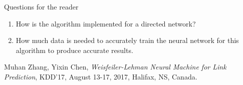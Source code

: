 \documentclass[12pt]{article}
\theoremstyle{remark}
\begin{document}
	Questions for the reader
	\begin{enumerate}
		\item How is the algorithm implemented for a directed network?
		\item How much data is needed to accurately train the neural network for this algorithm to produce accurate results.
	\end{enumerate}
	\vspace{0.5cm}
	
	\begin{thebibliography}{unsrt}
		Muhan Zhang, Yixin Chen, \emph{Weisfeiler-Lehman Neural Machine for Link Prediction}, KDD’17, August 13-17, 2017, Halifax, NS, Canada.
	\end{thebibliography}
	
\end{document}
